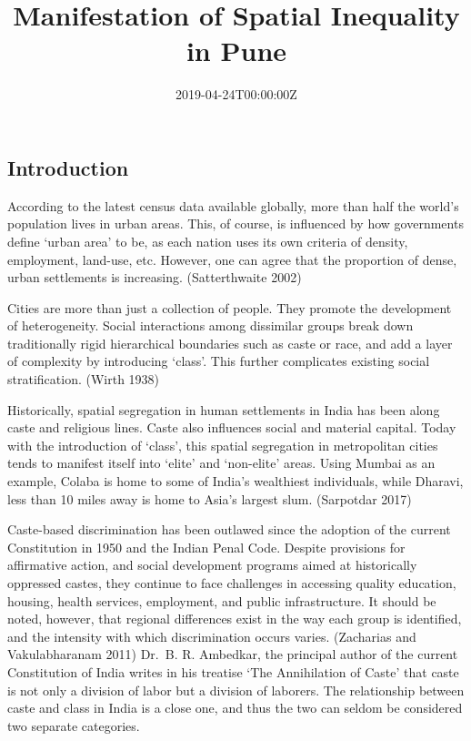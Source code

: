 \documentclass[
]{article}
\title{Manifestation of Spatial Inequality in Pune}
\author{}
\date{\vspace{-2.5em}2019-04-24T00:00:00Z}
\begin{document}
\maketitle

\hypertarget{introduction}{%
\subsection{Introduction}\label{introduction}}

According to the latest census data available globally, more than half
the world's population lives in urban areas. This, of course, is
influenced by how governments define `urban area' to be, as each nation
uses its own criteria of density, employment, land-use, etc. However,
one can agree that the proportion of dense, urban settlements is
increasing. (Satterthwaite 2002)

Cities are more than just a collection of people. They promote the
development of heterogeneity. Social interactions among dissimilar
groups break down traditionally rigid hierarchical boundaries such as
caste or race, and add a layer of complexity by introducing `class'.
This further complicates existing social stratification. (Wirth 1938)

Historically, spatial segregation in human settlements in India has been
along caste and religious lines. Caste also influences social and
material capital. Today with the introduction of `class', this spatial
segregation in metropolitan cities tends to manifest itself into `elite'
and `non-elite' areas. Using Mumbai as an example, Colaba is home to
some of India's wealthiest individuals, while Dharavi, less than 10
miles away is home to Asia's largest slum. (Sarpotdar 2017)

Caste-based discrimination has been outlawed since the adoption of the
current Constitution in 1950 and the Indian Penal Code. Despite
provisions for affirmative action, and social development programs aimed
at historically oppressed castes, they continue to face challenges in
accessing quality education, housing, health services, employment, and
public infrastructure. It should be noted, however, that regional
differences exist in the way each group is identified, and the intensity
with which discrimination occurs varies. (Zacharias and Vakulabharanam
2011) Dr.~B. R. Ambedkar, the principal author of the current
Constitution of India writes in his treatise `The Annihilation of Caste'
that caste is not only a division of labor but a division of laborers.
The relationship between caste and class in India is a close one, and
thus the two can seldom be considered two separate categories.
\end{document}

